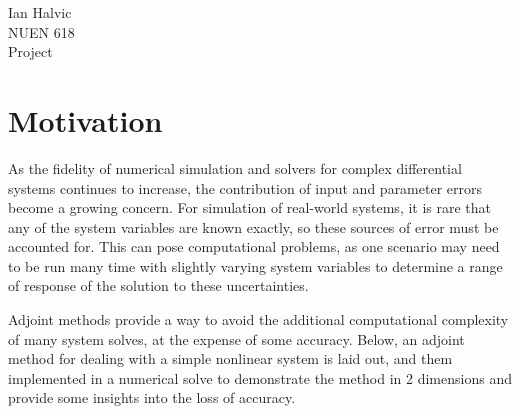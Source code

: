 \documentclass{article}
\begin{document}
\begin{center}
Ian Halvic \\
NUEN 618\\
Project\\
\end{center}

\section{Motivation}
As the fidelity of numerical simulation and solvers for complex differential systems continues to increase, the contribution of input and parameter errors become a growing concern. For simulation of real-world systems, it is rare that any of the system variables are known exactly, so these sources of error must be accounted for. This can pose computational problems, as one scenario may need to be run many time with slightly varying system variables to determine a range of response of the solution to these uncertainties. 

Adjoint methods provide a way to avoid the additional computational complexity of many system solves, at the expense of some accuracy. Below, an adjoint method for dealing with a simple nonlinear system is laid out, and them implemented in a numerical solve to demonstrate the method in 2 dimensions and provide some insights into the loss of accuracy.
\end{document}
